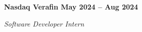 \vspace{0.1cm}
\textbf{Nasdaq Verafin \hfill May 2024 -- Aug 2024} \par
\textit{Software Developer Intern} \par
\begin{itemize}
	\item
  \item 
  \item 
  $851\item 
\end{itemize} \par